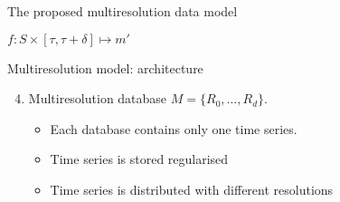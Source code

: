 \begin{frame}{The proposed multiresolution data model}
\begin{textblock*}{50mm}


  $f: S \times [\tau,\tau+\delta] \mapsto m'$


   \end{textblock*}

\end{frame}


\begin{frame}{Multiresolution model: architecture}

  \begin{enumerate}
    \setcounter{enumi}{3}
  \item Multiresolution database $M=\{R_0,\ldots,R_d \}$. 
    \begin{itemize}
    \item Each  database contains only one time series.
    \item Time series is stored regularised
    \item Time series is distributed with different resolutions
    \end{itemize}
  \end{enumerate}



  \begin{center}
    
  \end{center}

\end{frame}




